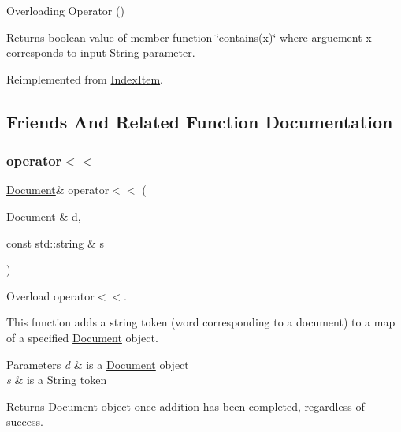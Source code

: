 Overloading Operator () 

Returns boolean value of member function \char`\"{}contains(x)\char`\"{} where arguement x corresponds to input String parameter. 

Reimplemented from \hyperlink{class_index_item_a38ccc46639b8d0b066024bad728c1bfa}{Index\+Item}.



\subsection{Friends And Related Function Documentation}
\mbox{\label{class_document_ab4b587c28bf3ed83ad2cb6e9052a5a58}} 
\subsubsection{\texorpdfstring{operator$<$$<$}{operator<<}\hspace{0.1cm}{\footnotesize\ttfamily [1/4]}}
{\footnotesize\ttfamily \hyperlink{class_document}{Document}\& operator$<$$<$ (\begin{DoxyParamCaption}\item[{\hyperlink{class_document}{Document} \&}]{d,  }\item[{const std\+::string \&}]{s }\end{DoxyParamCaption})\hspace{0.3cm}{\ttfamily [friend]}}



Overload operator$<$$<$. 

This function adds a string token (word corresponding to a document) to a map of a specified \hyperlink{class_document}{Document} object.


\begin{DoxyParams}{Parameters}
{\em d} & is a \hyperlink{class_document}{Document} object \\
\hline
{\em s} & is a String token \\
\hline
\end{DoxyParams}
\begin{DoxyReturn}{Returns}
\hyperlink{class_document}{Document} object once addition has been completed, regardless of success. 
\end{DoxyReturn}
\mbox{\label{class_document_a6c2e084b73080867237d1637bc040d66}} 
